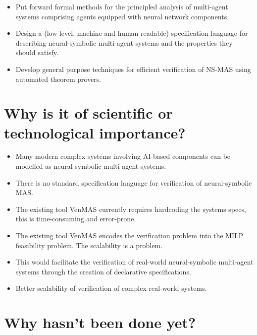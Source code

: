 \documentclass[11pt]{article}
\begin{document}
\begin{itemize}
\item Put forward formal methods for the principled analysis of
  multi-agent systems comprising agents equipped with neural network
  components.
  
\item Design a (low-level, machine and human readable) specification
  language for describing neural-symbolic multi-agent systems and the
  properties they should satisfy.

\item Develop general purpose techniques for efficient verification of
  NS-MAS using automated theorem provers.
\end{itemize}

\section{Why is it of scientific or technological importance?}


\begin{itemize}
\item Many modern complex systems involving AI-based components can be
  modelled as neural-symbolic multi-agent systems.
  
\item There is no standard specification language for verification of
  neural-symbolic MAS.

\item The existing tool VenMAS currently requires hardcoding the
  systems specs, this is time-consuming and error-prone.

\item The existing tool VenMAS encodes the verification problem into
  the MILP feasibility problem. The scalability is a problem.

\item This would facilitate the verification of real-world
  neural-symbolic multi-agent systems through the creation of
  declarative specifications.

\item Better scalability of verification of complex real-world systems.
\end{itemize}


\section{Why hasn't been done yet?}
\end{document}
